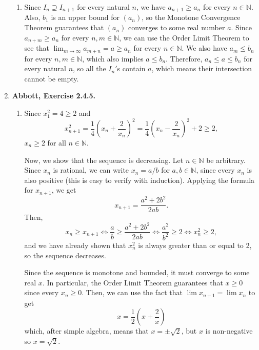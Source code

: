 \documentclass{article}
\newcommand{\N}{\mathbb{N}}
\newcommand{\ra}{\rightarrow}
\newcommand{\exc}[2][Abbott]{\item \textbf{#1, Exercise #2.}}
\begin{document}
\begin{enumerate}
\begin{enumerate}
        \item Since $I_{n} \supseteq I_{n+1}$ for every natural $n$, we have $a_{n+1} \geq a_n$ for every $n \in \N$. Also, $b_1$ is an upper bound for $(a_n)$, so the Monotone Convergence Theorem guarantees that $(a_n)$ converges to some real number $a$. Since $a_{n+m} \geq a_n$ for every $n,m \in \N$, we can use the Order Limit Theorem to see that $\lim_{m \ra \infty} a_{m+n} = a \geq a_n$ for every $n \in \N$. We also have $a_m \leq b_n$ for every $n, m \in \N$, which also implies $a \leq b_n$. Therefore, $a_n \leq a \leq b_n$ for every natural $n$, so all the $I_n'$s contain $a$, which means their intersection cannot be empty.
    \end{enumerate}
    
    \exc{2.4.5}
    \begin{enumerate}
        \item Since $x_1^2 = 4 \geq 2$ and
        \begin{equation*}
            x_{n+1}^2 = \frac{1}{4}\left(x_n+\frac{2}{x_n}\right)^2 = 
            \frac{1}{4}\left(x_n-\frac{2}{x_n}\right)^2 + 2 \geq 2,
        \end{equation*} $x_n \geq 2$ for all $n \in \N$.
        
        Now, we show that the sequence is decreasing. Let $n \in \N$ be arbitrary. Since $x_n$ is rational, we can write $x_n = a/b$ for $a,b \in \N$, since every $x_n$ is also positive (this is easy to verify with induction). Applying the formula for $x_{n+1}$, we get 
        \begin{equation*}
            x_{n+1} = \frac{a^2+2b^2}{2ab}.
        \end{equation*}
        Then, 
        \begin{equation*}
            x_n \geq x_{n+1} \iff \frac{a}{b} \geq \frac{a^2+2b^2}{2ab} \iff
            \frac{a^2}{b^2} \geq 2 \iff x_n^2 \geq 2,
        \end{equation*} and we have already shown that $x_n^2$ is always greater than or equal to 2, so the sequence decreases.
        
        Since the sequence is monotone and bounded, it must converge to some real $x$. In particular, the Order Limit Theorem guarantees that $x \geq 0$ since every $x_n \geq 0$.
        Then, we can use the fact that $\lim x_{n+1} = \lim x_n$ to get 
        \begin{equation*}
            x = \frac{1}{2} \left(x + \frac{2}{x}\right)
        \end{equation*} which, after simple algebra, means that $x = \pm \sqrt{2}$, but $x$ is non-negative so $x = \sqrt{2}$.
        

\end{enumerate}
\end{enumerate}
\end{document}
